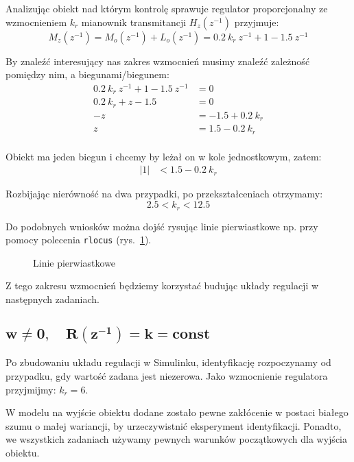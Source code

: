 \documentclass[11pt, a4paper]{article}
\begin{document}
Analizując obiekt nad którym kontrolę sprawuje regulator proporcjonalny ze wzmocnieniem $k_r$ mianownik transmitancji $H_z(z^{-1})$ przyjmuje:
\[
	M_z(z^{-1}) = M_o(z^{-1}) + L_o(z^{-1}) = 0.2 \ k_r \ z^{-1} + 1 - 1.5 \ z^{-1}
\]

By znaleźć interesujący nas zakres wzmocnień musimy znaleźć zależność pomiędzy nim, a biegunami/biegunem:
\begin{align*}
0.2 \ k_r \ z^{-1} + 1 - 1.5 \ z^{-1} &= 0 \\
0.2 \ k_r + z - 1.5 &= 0 \\
-z &= -1.5 + 0.2 \ k_r \\
z &= 1.5 - 0.2 \ k_r \\
\end{align*}

Obiekt ma jeden biegun i chcemy by leżał on w kole jednostkowym, zatem:
\begin{align*}
|1| &< 1.5 - 0.2 \ k_r
\end{align*}

Rozbijając nierówność na dwa przypadki, po przekształceniach otrzymamy:
\[
	2.5 < k_r < 12.5
\]

Do podobnych wniosków można dojść rysując linie pierwiastkowe np. przy pomocy polecenia \texttt{rlocus} (rys.~\ref{fig:rlocus}).

\begin{figure}[htbp!]
	\centering
	\hfill%
	\caption{Linie pierwiastkowe}
	\label{fig:rlocus}
\end{figure}

Z tego zakresu wzmocnień będziemy korzystać budując układy regulacji w następnych zadaniach.

\subsection{$\displaystyle \mathbf{w \neq 0, \quad R(z^{-1}) = k = const}$}

Po zbudowaniu układu regulacji w Simulinku, identyfikację rozpoczynamy od przypadku, gdy wartość zadana jest niezerowa. Jako wzmocnienie regulatora przyjmijmy: $k_r = 6$.

W modelu na wyjście obiektu dodane zostało pewne zakłócenie w postaci białego szumu o małej wariancji, by urzeczywistnić eksperyment identyfikacji. Ponadto, we wszystkich zadaniach używamy pewnych warunków początkowych dla wyjścia obiektu.
\end{document}
